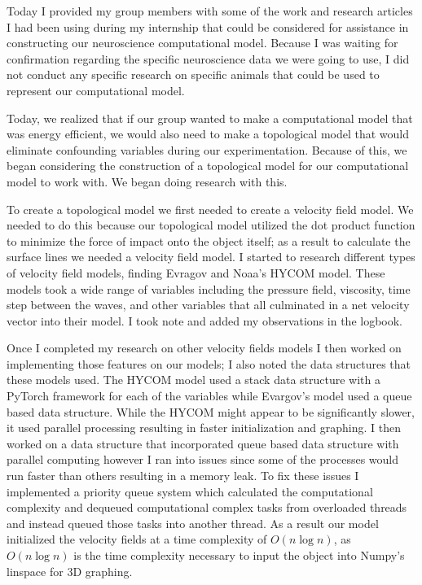 \newpage


Today I provided my group members with some of the work and research articles I had been using during my internship that could be considered for assistance in constructing our neuroscience computational model. Because I was waiting for confirmation regarding the specific neuroscience data we were going to use, I did not conduct any specific research on specific animals that could be used to represent our computational model. 

\newpage


Today, we realized that if our group wanted to make a computational model that was energy efficient, we would also need to make a topological model that would eliminate confounding variables during our experimentation. Because of this, we began considering the construction of a topological model for our computational model to work with. We began doing research with this. 

\newpage


To create a topological model we first needed to create a velocity field model. We needed to do this because our topological model utilized the dot product function to minimize the force of impact onto the object itself; as a result to calculate the surface lines we needed a velocity field model. I started to research different types of velocity field models, finding Evragov and Noaa's HYCOM  model. These models took a wide range of variables including the pressure field, viscosity, time step between the waves, and other variables that all culminated in a net velocity vector into their model. I took note and added my observations in the logbook.

\newpage


Once I completed my research on other velocity fields models I then worked on implementing those features on our models; I also noted the data structures that these models used. The HYCOM model used a stack data structure with a PyTorch framework for each of the variables while Evargov's model used a queue based data structure. While the HYCOM might appear to be significantly slower, it used parallel processing resulting in faster initialization and graphing. I then worked on a data structure that incorporated queue based data structure with parallel computing however I ran into issues since some of the processes would run faster than others resulting in a memory leak. To fix these issues I implemented a priority queue system which calculated the computational complexity and dequeued computational complex tasks from overloaded threads and instead queued those tasks into another thread. As a result our model initialized the velocity fields at a time complexity of $O(n\log n)$, as $O(n\log n)$ is the time complexity necessary to input the object into Numpy's linspace for 3D graphing. 

